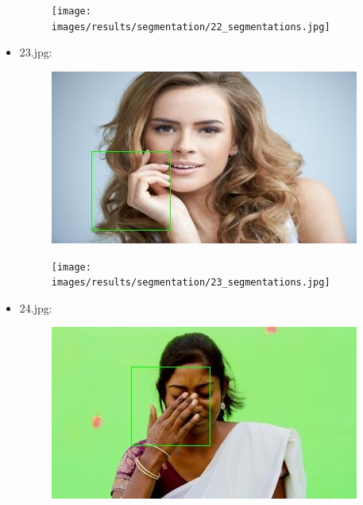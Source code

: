 \begin{itemize}
\begin{figure}[!htb]
            \begin{minipage}{0.5\textwidth}
                \centering
                \texttt{[image: images/results/segmentation/22\_segmentations.jpg]}
            \end{minipage}
        \end{figure}
    \item 23.jpg:
        \begin{figure}[!htb]
            \begin{minipage}{0.5\textwidth}
                \centering
                \includegraphics[scale = 0.68]{images/results/detection/23_detections.jpg}
            \end{minipage}\hfill
            \begin{minipage}{0.5\textwidth}
                \centering
                \texttt{[image: images/results/segmentation/23\_segmentations.jpg]}
            \end{minipage}
        \end{figure}
    \newpage
    \item 24.jpg:
        \begin{figure}[!htb]
            \begin{minipage}{0.5\textwidth}
                \centering
                \includegraphics[scale = 0.68]{images/results/detection/24_detections.jpg}
            \end{minipage}\hfill
            \begin{minipage}{0.5\textwidth}

\end{minipage}
\end{figure}
\end{itemize}
